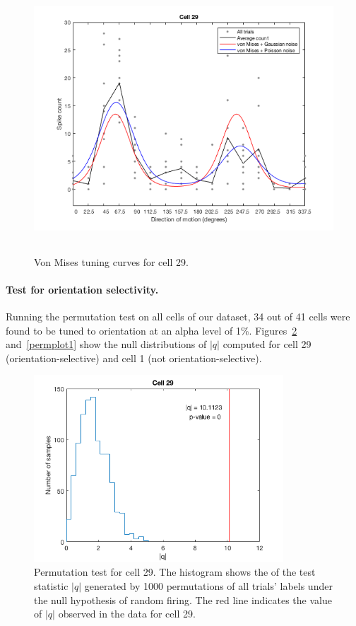 \documentclass[10pt]{article}
\begin{document}
\begin{figure}[!h]
\centering
\includegraphics[height=10cm]{fitVonMises.png}
\caption{Von Mises tuning curves for cell 29.
\label{fitVonMises}}
\end{figure}

\paragraph{Test for orientation selectivity.} Running the permutation test on all cells of our dataset, 34 out of 41 cells were found to be tuned to orientation at an alpha level of 1\%. Figures~\ref{permplot29} and~\ref{permplot1} show the null distributions of $|q|$ computed for cell 29 (orientation-selective) and cell 1 (not orientation-selective).

\begin{figure}[!h]
\centering
\includegraphics[height=7cm]{permplot.png}
\caption{Permutation test for cell 29. The histogram shows the of the test statistic $|q|$ generated by 1000 permutations of all trials' labels under the null hypothesis of random firing. The red line indicates the value of $|q|$ observed in the data for cell 29.
\label{permplot29}}
\end{figure}
\end{document}
